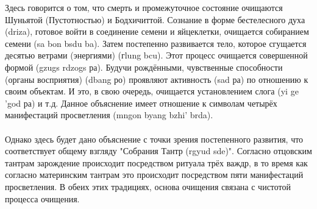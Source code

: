 Здесь говорится о том, что смерть и промежуточное состояние очищаются Шуньятой
(Пустотностью) и Бодхичиттой. Сознание в форме бестелесного духа (driza), готовое войти
в соединение семени и яйцеклетки, очищается собиранием семени (sa bon bsdu ba). Затем
постепенно развивается тело, которое сгущается десятью ветрами (энергиями) (гlung bcu).
Этот процесс очищается совершенной формой (gzugs rdzogs ра). Будучи рождёнными,
чувственные способности (органы восприятия) (dbang ро) проявляют активность (sad ра) по
отношению к своим объектам. И это, в свою очередь, очищается установлением слога (yi ge
'god ра) и т.д. Данное объяснение имеет отношение к символам четырёх манифестаций
просветления (mngon byang bzhi' brda).\\
\\
Однако здесь будет дано объяснение с точки зрения постепенного развития, что
соответствует общему взгляду "Собрания Тантр (rgyud sde)". Согласно отцовским тантрам
зарождение происходит посредством ритуала трёх важдр, в то время как согласно
материнским тантрам это происходит посредством пяти манифестаций просветления. В
обеих этих традициях, основа очищения связана с чистотой процесса очищения.\\
\\
